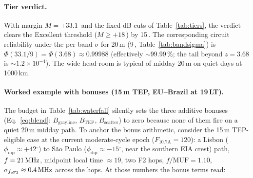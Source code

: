 \documentclass[11pt,a4paper]{article}
\newcommand{\SI}[2]{#1\,\text{#2}}
\newcommand{\si}[1]{\text{#1}}
\newcommand{\dB}{\text{dB}}
\newcommand{\MHz}{\text{MHz}}
\newcommand{\degree}{\ensuremath{{}^\circ}}
\begin{document}
\paragraph{Tier verdict.}
With margin $M = +33.1$\,\si{\dB} and the fixed-dB cuts of
Table~\ref{tab:tiers}, the verdict clears the Excellent threshold
($M \ge +18$\,\si{\dB}) by 15\,\si{\dB}.  The corresponding
circuit reliability under the per-band $\sigma$ for 20\,m
(\SI{9}{\dB}, Table~\ref{tab:bandsigma}) is
$\Phi(33.1 / 9) = \Phi(3.68) \approx 0.99988$ (effectively
$\sim$99.99\,\%; the tail beyond $z = 3.68$ is
$\sim 1.2 \times 10^{-4}$).  The wide head-room is typical of
midday 20\,m on quiet days at 1000\,km.

\paragraph{Worked example with bonuses (15\,m TEP, EU--Brazil at 19\,LT).}
The budget in Table~\ref{tab:waterfall} silently sets the three
additive bonuses (Eq.~\ref{eq:blend}: $B_{\text{grayline}}$,
$B_{\text{TEP}}$, $B_{\text{scatter}}$) to zero because none of
them fire on a quiet 20\,m midday path.  To anchor the bonus
arithmetic, consider the 15\,m TEP-eligible case at the current
moderate-cycle epoch ($F_{10.7\text{A}} = 120$): a Lisbon
($\phi_{\text{dip}} \approx +42\degree$) to S\~ao Paulo
($\phi_{\text{dip}} \approx -15\degree$, near the southern EIA
crest) path, $f = \SI{21}{\MHz}$,
midpoint local time $\approx 19$, two F2 hops, $f / \text{MUF} =
1.10$, $\sigma_{f_{\text{oF2}}} \approx \SI{0.4}{\MHz}$ across the
hops.  At those numbers the bonus terms read:
\end{document}
